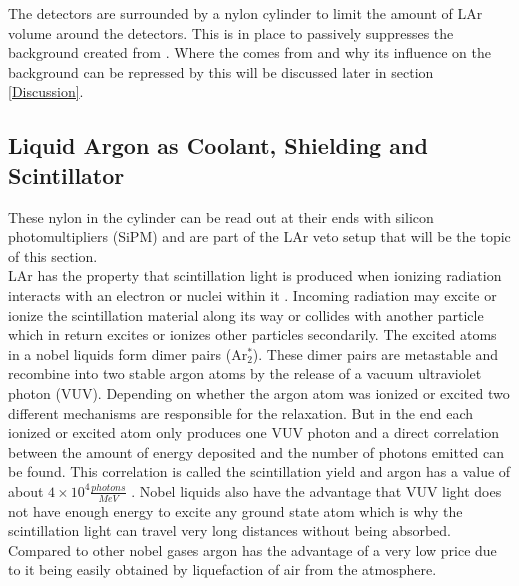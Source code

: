 \documentclass[encoding=utf8,british]{tumphthesis}
\begin{document}
The detectors are surrounded by a nylon cylinder to limit the amount of LAr volume around the detectors.
This is in place to passively suppresses the background created from .
Where the  comes from and why its influence on the background can be repressed by this will be discussed later in section \ref{Discussion}.\\

\subsection{Liquid Argon as Coolant, Shielding and Scintillator} 
\label{sec:LArcoolant}

These nylon in the cylinder can be read out at their ends with silicon photomultipliers (SiPM) and are part of the LAr veto setup that will be the topic of this section.
\\

LAr has the property that scintillation light is produced when ionizing radiation interacts with an electron or nuclei within it \cite{olsen_improvements_nodate}.
Incoming radiation may excite or ionize the scintillation material along its way or collides with another particle which in return excites or ionizes other particles secondarily.
The excited atoms in a nobel liquids form dimer pairs (Ar$^*_2$).
These dimer pairs are metastable and recombine into two stable argon atoms by the release of a vacuum ultraviolet photon (VUV).
Depending on whether the argon atom was ionized or excited two different mechanisms are responsible for the relaxation.
But in the end each ionized or excited atom only produces one VUV photon and a direct correlation between the amount of energy deposited and the number of photons emitted can be found.
This correlation is called the scintillation yield and argon has a value of about $4\times10^4\frac{\unit{photons}}{\unit{MeV}}$ \cite{olsen_improvements_nodate}.
Nobel liquids also have the advantage that VUV light does not have enough energy to excite any ground state atom which is why the scintillation light can travel very long distances without being absorbed.
Compared to other nobel gases argon has the advantage of a very low price due to it being easily obtained by liquefaction of air from the atmosphere.
\\
\end{document}
